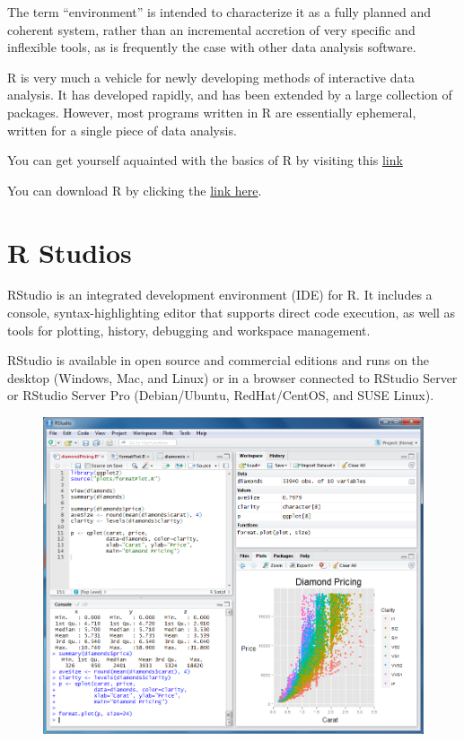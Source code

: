 \documentclass[]{book}
\theoremstyle{definition}
\theoremstyle{definition}
\theoremstyle{definition}
\theoremstyle{remark}
\begin{document}
The term ``environment'' is intended to characterize it as a fully
planned and coherent system, rather than an incremental accretion of
very specific and inflexible tools, as is frequently the case with other
data analysis software.

R is very much a vehicle for newly developing methods of interactive
data analysis. It has developed rapidly, and has been extended by a
large collection of packages. However, most programs written in R are
essentially ephemeral, written for a single piece of data analysis.

You can get yourself aquainted with the basics of R by visiting this
\href{https://cran.r-project.org/doc/manuals/r-release/R-intro.html}{link}

You can download R by clicking the
\href{https://cran.r-project.org/}{link here}.

\section{R Studios}\label{r-studios}

RStudio is an integrated development environment (IDE) for R. It
includes a console, syntax-highlighting editor that supports direct code
execution, as well as tools for plotting, history, debugging and
workspace management.

RStudio is available in open source and commercial editions and runs on
the desktop (Windows, Mac, and Linux) or in a browser connected to
RStudio Server or RStudio Server Pro (Debian/Ubuntu, RedHat/CentOS, and
SUSE Linux).

\begin{figure}
\centering
\includegraphics{./images/RStudio-Screenshot.png}
\caption{}
\end{figure}
\end{document}
